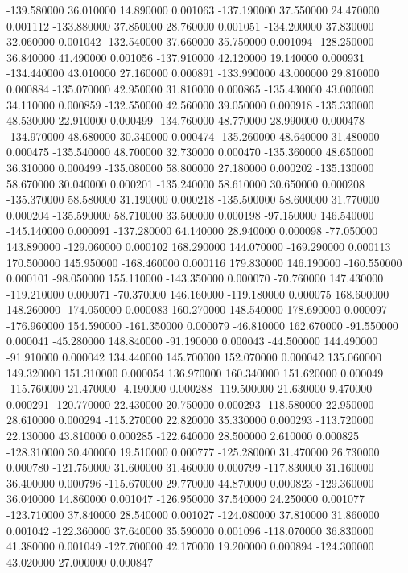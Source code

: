 -139.580000 36.010000 14.890000 0.001063 
-137.190000 37.550000 24.470000 0.001112 
-133.880000 37.850000 28.760000 0.001051 
-134.200000 37.830000 32.060000 0.001042 
-132.540000 37.660000 35.750000 0.001094 
-128.250000 36.840000 41.490000 0.001056 
-137.910000 42.120000 19.140000 0.000931 
-134.440000 43.010000 27.160000 0.000891 
-133.990000 43.000000 29.810000 0.000884 
-135.070000 42.950000 31.810000 0.000865 
-135.430000 43.000000 34.110000 0.000859 
-132.550000 42.560000 39.050000 0.000918 
-135.330000 48.530000 22.910000 0.000499 
-134.760000 48.770000 28.990000 0.000478 
-134.970000 48.680000 30.340000 0.000474 
-135.260000 48.640000 31.480000 0.000475 
-135.540000 48.700000 32.730000 0.000470 
-135.360000 48.650000 36.310000 0.000499 
-135.080000 58.800000 27.180000 0.000202 
-135.130000 58.670000 30.040000 0.000201 
-135.240000 58.610000 30.650000 0.000208 
-135.370000 58.580000 31.190000 0.000218 
-135.500000 58.600000 31.770000 0.000204 
-135.590000 58.710000 33.500000 0.000198 
-97.150000 146.540000 -145.140000 0.000091 
-137.280000 64.140000 28.940000 0.000098 
-77.050000 143.890000 -129.060000 0.000102 
168.290000 144.070000 -169.290000 0.000113 
170.500000 145.950000 -168.460000 0.000116 
179.830000 146.190000 -160.550000 0.000101 
-98.050000 155.110000 -143.350000 0.000070 
-70.760000 147.430000 -119.210000 0.000071 
-70.370000 146.160000 -119.180000 0.000075 
168.600000 148.260000 -174.050000 0.000083 
160.270000 148.540000 178.690000 0.000097 
-176.960000 154.590000 -161.350000 0.000079 
-46.810000 162.670000 -91.550000 0.000041 
-45.280000 148.840000 -91.190000 0.000043 
-44.500000 144.490000 -91.910000 0.000042 
134.440000 145.700000 152.070000 0.000042 
135.060000 149.320000 151.310000 0.000054 
136.970000 160.340000 151.620000 0.000049 
-115.760000 21.470000 -4.190000 0.000288 
-119.500000 21.630000 9.470000 0.000291 
-120.770000 22.430000 20.750000 0.000293 
-118.580000 22.950000 28.610000 0.000294 
-115.270000 22.820000 35.330000 0.000293 
-113.720000 22.130000 43.810000 0.000285 
-122.640000 28.500000 2.610000 0.000825 
-128.310000 30.400000 19.510000 0.000777 
-125.280000 31.470000 26.730000 0.000780 
-121.750000 31.600000 31.460000 0.000799 
-117.830000 31.160000 36.400000 0.000796 
-115.670000 29.770000 44.870000 0.000823 
-129.360000 36.040000 14.860000 0.001047 
-126.950000 37.540000 24.250000 0.001077 
-123.710000 37.840000 28.540000 0.001027 
-124.080000 37.810000 31.860000 0.001042 
-122.360000 37.640000 35.590000 0.001096 
-118.070000 36.830000 41.380000 0.001049 
-127.700000 42.170000 19.200000 0.000894 
-124.300000 43.020000 27.000000 0.000847 
